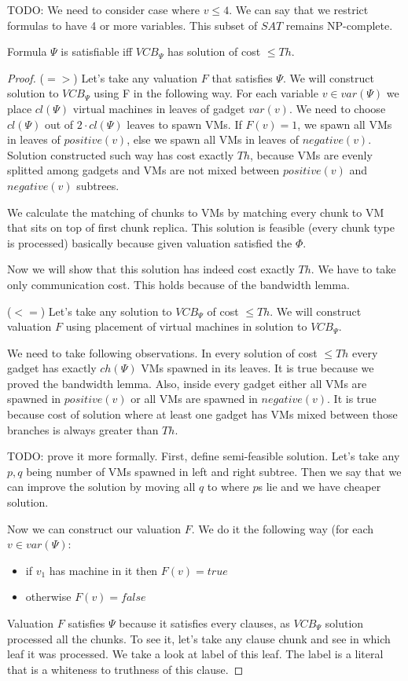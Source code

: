 TODO: We need to consider case where $v \leq 4$. We can say that we
restrict formulas to have 4 or more variables. This subset of $SAT$ remains NP-complete.

\begin{theorem}Formula $\Psi$ is satisfiable iff $VCB_{\Psi}$ has
solution of cost $\leq Th$.
\end{theorem}

\begin{proof}
($=>$) Let's take any valuation $F$ that satisfies $\Psi$. We will construct
solution to $VCB_{\Psi}$ using F in the following way. For each
variable $v \in var(\Psi)$ we place $cl(\Psi)$ virtual machines in
leaves of gadget $var(v)$. We need to choose $cl(\Psi)$ out of
$2 \cdot cl(\Psi)$ leaves to spawn VMs. If $F(v) = 1$, we spawn all VMs in leaves
of $positive(v)$, else we spawn all VMs in leaves of
$negative(v)$. Solution constructed such way has cost exactly
$Th$, because VMs are evenly splitted among gadgets and VMs are not
mixed between $positive(v)$ and $negative(v)$ subtrees.

We calculate the matching of chunks to VMs by matching every chunk to
VM that sits on top of first chunk replica. This solution is feasible
(every chunk type is processed) basically
because given valuation satisfied the $\Phi$.

Now we will show that this solution has indeed cost exactly $Th$. We have to
take only communication cost. This holds because of the bandwidth lemma.

($<=$) Let's take any solution to $VCB_{\Psi}$ of cost $\leq Th$. We
will construct valuation $F$ using placement of virtual machines in
solution to $VCB_{\Psi}$.

We need to take following observations. In every solution of cost
$\leq Th$ every gadget has exactly $ch(\Psi)$ VMs spawned in its
leaves. It is true because we proved the bandwidth lemma. Also, inside
every gadget either all VMs are spawned in $positive(v)$ or all VMs
are spawned in $negative(v)$. It is true because cost of solution
where at least one gadget has VMs mixed between those branches is
always greater than $Th$. 

TODO: prove it more formally. First, define semi-feasible solution. Let's take any $p,q$ being number of VMs
spawned in left and right subtree. Then we say that we can improve the
solution by moving all $q$ to where $p$s lie and we have cheaper solution.

Now we can construct our valuation $F$. We do it the following way
(for each $v \in var(\Psi)$:

\begin{itemize}
\item if $v_1$ has machine in it then $F(v) = true$
\item otherwise $F(v) = false$
\end{itemize}

Valuation $F$ satisfies $\Psi$ because it satisfies every clauses, as
$VCB_{\Psi}$ solution processed all the chunks. To see it, let's take
any clause chunk and see in which leaf it was processed. We take a
look at label of this leaf. The label is a literal that is a whiteness
to truthness of this clause.
\end{proof}

